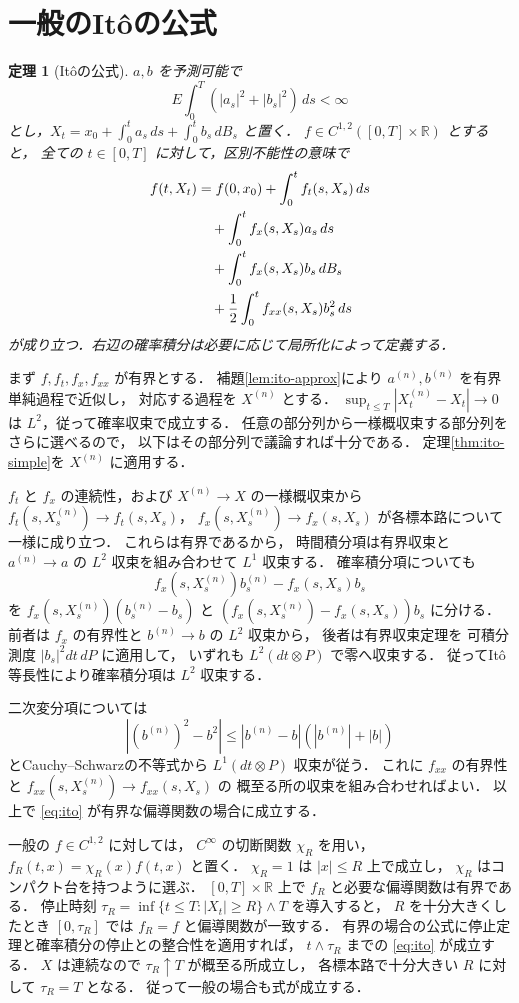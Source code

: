 \documentclass[a5paper,10pt,onecolumn]{jsarticle}
\makeatletter
\theoremstyle{mathnotetheorem}
\newtheorem{theorem}{定理}[section]
\renewcommand{\proofname}{証明}
\renewenvironment{proof}[1][\proofname]{%
  \par\pushQED{\qed}\normalfont\topsep4\p@\@plus2\p@\relax
  \trivlist\item[\hskip\labelsep\bfseries #1]\ignorespaces
}{\popQED\endtrivlist\@endpefalse}
\makeatother
\begin{document}
\section{一般のIt\^oの公式}

\begin{theorem}[It\^oの公式]\label{thm:ito}
$a,b$ を予測可能で
\[
 E\int_0^T(|a_s|^2+|b_s|^2)\,ds<\infty
\]
とし，$X_t=x_0+\int_0^ta_s\,ds+\int_0^tb_s\,dB_s$
と置く．
$f\in C^{1,2}([0,T]\times\mathbb R)$ とすると，
全ての $t\in[0,T]$ に対して，区別不能性の意味で
\begin{align}
 f(t,X_t)
 &=f(0,x_0)+\int_0^t f_t(s,X_s)\,ds\notag\\
 &\quad+\int_0^t f_x(s,X_s)a_s\,ds\notag\\
 &\quad+\int_0^t f_x(s,X_s)b_s\,dB_s\notag\\
 &\quad+\frac12\int_0^t f_{xx}(s,X_s)b_s^2\,ds
 \label{eq:ito}
\end{align}
が成り立つ．右辺の確率積分は必要に応じて局所化によって定義する．
\end{theorem}
\begin{proof}
まず $f,f_t,f_x,f_{xx}$ が有界とする．
補題\ref{lem:ito-approx}により
$a^{(n)},b^{(n)}$ を有界単純過程で近似し，
対応する過程を $X^{(n)}$ とする．
$\sup_{t\le T}|X^{(n)}_t-X_t|\to0$ は
$L^2$，従って確率収束で成立する．
任意の部分列から一様概収束する部分列をさらに選べるので，
以下はその部分列で議論すれば十分である．
定理\ref{thm:ito-simple}を $X^{(n)}$ に適用する．

$f_t$ と $f_x$ の連続性，および
$X^{(n)}\to X$ の一様概収束から
$f_t(s,X^{(n)}_s)\to f_t(s,X_s)$，
$f_x(s,X^{(n)}_s)\to f_x(s,X_s)$
が各標本路について一様に成り立つ．
これらは有界であるから，
時間積分項は有界収束と
$a^{(n)}\to a$ の $L^2$ 収束を組み合わせて
$L^1$ 収束する．
確率積分項についても
\[
 f_x(s,X^{(n)}_s)b^{(n)}_s
 -f_x(s,X_s)b_s
\]
を
$f_x(s,X^{(n)}_s)(b^{(n)}_s-b_s)$ と
$(f_x(s,X^{(n)}_s)-f_x(s,X_s))b_s$
に分ける．前者は $f_x$ の有界性と
$b^{(n)}\to b$ の $L^2$ 収束から，
後者は有界収束定理を
可積分測度 $|b_s|^2dt\,dP$ に適用して，
いずれも $L^2(dt\otimes P)$ で零へ収束する．
従ってIt\^o等長性により確率積分項は $L^2$ 収束する．

二次変分項については
\[
 |(b^{(n)})^2-b^2|
 \le|b^{(n)}-b|(|b^{(n)}|+|b|)
\]
とCauchy--Schwarzの不等式から
$L^1(dt\otimes P)$ 収束が従う．
これに $f_{xx}$ の有界性と
$f_{xx}(s,X^{(n)}_s)\to f_{xx}(s,X_s)$ の
概至る所の収束を組み合わせればよい．
以上で \eqref{eq:ito} が有界な偏導関数の場合に成立する．

一般の $f\in C^{1,2}$ に対しては，
$C^\infty$ の切断関数 $\chi_R$ を用い，
$f_R(t,x)=\chi_R(x)f(t,x)$ と置く．
$\chi_R=1$ は $|x|\le R$ 上で成立し，
$\chi_R$ はコンパクト台を持つように選ぶ．
$[0,T]\times\mathbb R$ 上で
$f_R$ と必要な偏導関数は有界である．
停止時刻
$\tau_R=\inf\{t\le T:|X_t|\ge R\}\wedge T$
を導入すると，
$R$ を十分大きくしたとき
$[0,\tau_R]$ では $f_R=f$ と偏導関数が一致する．
有界の場合の公式に停止定理と確率積分の停止との整合性を適用すれば，
$t\wedge\tau_R$ までの \eqref{eq:ito} が成立する．
$X$ は連続なので $\tau_R\uparrow T$ が概至る所成立し，
各標本路で十分大きい $R$ に対して $\tau_R=T$ となる．
従って一般の場合も式が成立する．
\end{proof}
\end{document}
